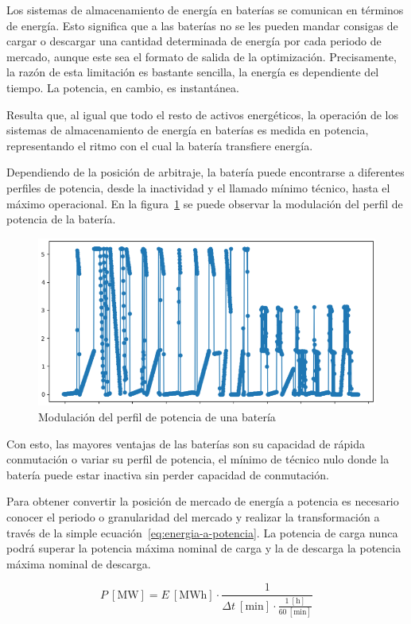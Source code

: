 Los sistemas de almacenamiento de energía en baterías se comunican en términos de energía. Esto significa que a las baterías no se les pueden mandar consigas de cargar o descargar una cantidad determinada de energía por cada periodo de mercado, aunque este sea el formato de salida de la optimización. Precisamente, la razón de esta limitación es bastante sencilla, la energía es dependiente del tiempo. La potencia, en cambio, es instantánea.

Resulta que, al igual que todo el resto de activos energéticos, la operación de los sistemas de almacenamiento de energía en baterías es medida en potencia, representando el ritmo con el cual la batería transfiere energía.

Dependiendo de la posición de arbitraje, la batería puede encontrarse a diferentes perfiles de potencia, desde la inactividad y el llamado mínimo técnico, hasta el máximo operacional. En la figura~\ref{fig:perfil-potencia} se puede observar la modulación del perfil de potencia de la batería.

\begin{figure}
\centering
\includegraphics[width=0.5\linewidth]{figures/perfil-potencia.png}
\caption{Modulación del perfil de potencia de una batería}
\label{fig:perfil-potencia}
\end{figure}

Con esto, las mayores ventajas de las baterías son su capacidad de rápida conmutación o variar su perfil de potencia, el mínimo de técnico nulo donde la batería puede estar inactiva sin perder capacidad de conmutación.

Para obtener convertir la posición de mercado de energía a potencia es necesario conocer el periodo o granularidad del mercado y realizar la transformación a través de la simple ecuación~\ref{eq:energia-a-potencia}. La potencia de carga nunca podrá superar la potencia máxima nominal de carga y la de descarga la potencia máxima nominal de descarga.

\begin{equation}
\label{eq:energia-a-potencia}
P~[\text{MW}] = E~[\text{MWh}] \cdot \frac{1}{\Delta t~[\text{min}] \cdot \frac{1~[\text{h}]}{60~[\text{min}]}}
\end{equation}

